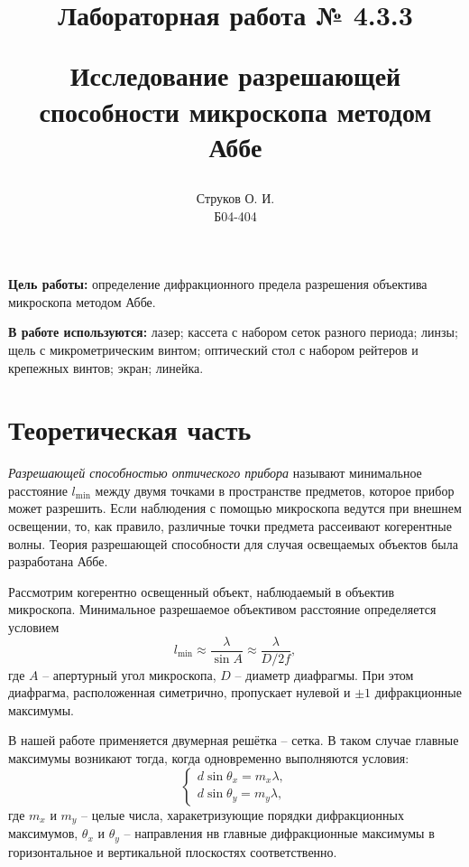 \documentclass[a4paper,12pt]{article} %
\begin{document}
\title{\begin{center}Лабораторная работа № 4.3.3\end{center}
Исследование разрешающей способности микроскопа методом Аббе}
\author{Струков О. И. \\ Б04-404}
\date{}

\thispagestyle{empty}
\maketitle
\newpage
{}

\textbf{Цель работы:} определение дифракционного предела разрешения объектива микроскопа методом Аббе.

\textbf{В работе используются:} лазер; кассета с набором сеток разного периода; линзы; щель с микрометрическим винтом; оптический стол с набором рейтеров и крепежных винтов; экран; линейка. 


\section*{Теоретическая часть}
	\textit{Разрешающей способностью оптического прибора} называют минимальное расстояние $l_{\text{min}}$ между двумя точками в пространстве предметов, которое прибор может разрешить. Если наблюдения с помощью микроскопа ведутся при внешнем освещении, то, как правило, различные точки предмета рассеивают когерентные волны. Теория разрешающей способности для случая освещаемых объектов была разработана Аббе.

	Рассмотрим когерентно освещенный объект, наблюдаемый в объектив микроскопа. Минимальное разрешаемое объективом расстояние определяется условием
	\begin{equation}
		\label{min}
		l_{\text{min}} \approx \frac{\lambda}{\sin A} \approx \frac{\lambda}{D/2f},
	\end{equation}
	где $A$ -- апертурный угол микроскопа, $D$ -- диаметр диафрагмы. При этом диафрагма, расположенная симетрично, пропускает нулевой и $\pm 1$ дифракционные максимумы.
	
	В нашей работе применяется двумерная решётка -- сетка. В таком случае главные максимумы возникают тогда, когда одновременно выполняются условия:
	\begin{equation}
		\label{system}
		\begin{cases}
			d \sin \theta_x = m_x \lambda, \\
			d \sin \theta_y = m_y \lambda,
		\end{cases}
	\end{equation}
	где $m_x$ и $m_y$ -- целые числа, харакетризующие порядки дифракционных максимумов, $\theta_x$ и $\theta_y$ -- направления нв главные дифракционные максимумы в горизонтальное и вертикальной плоскостях соответственно.
	
\end{document}
